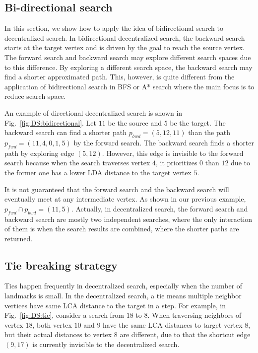 \subsection{Bi-directional search}

In this section, we show how to apply the idea of bidirectional search to decentralized search. In bidirectional decentralized search, the backward search starts at the target vertex and is driven by the goal to reach the source vertex. The forward search and backward search may explore different search spaces due to this difference. By exploring a different search space, the backward search may find a shorter approximated path. This, however, is quite different from the application of bidirectional search in BFS or A* search where the main focus is to reduce search space.

An example of directional decentralized search is shown in Fig.~\ref{fig:DS:bidirectional}. Let $11$ be the source and $5$ be the target. The backward search can find a shorter path $p_{bwd} = (5, 12, 11)$ than the path $p_{fwd} = (11, 4, 0, 1, 5)$ by the forward search. The backward search finds a shorter path by exploring edge $(5, 12)$. However, this edge is invisible to the forward search because when the search traverses vertex $4$, it prioritizes $0$ than $12$ due to the former one has a lower LDA distance to the target vertex $5$.

It is not guaranteed that the forward search and the backward search will eventually meet at any intermediate vertex. As shown in our previous example, $p_{fwd} \cap p_{bwd} = (11, 5)$. Actually, in decentralized search, the forward search and backward search are mostly two independent searches, where the only interaction of them is when the search results are combined, where the shorter paths are returned. 

\subsection{Tie breaking strategy}

Ties happen frequently in decentralized search, especially when the number of landmarks is small. In the decentralized search, a tie means multiple neighbor vertices have same LCA distance to the target in a step. 
For example, in Fig.~\ref{fig:DS:tie}, consider a search from $18$ to $8$. When traversing neighbors of vertex $18$, both vertex $10$ and $9$ have the same LCA distances to target vertex $8$, but their actual distances to vertex $8$ are different, due to that the shortcut edge $(9, 17)$ is currently invisible to the decentralized search.

